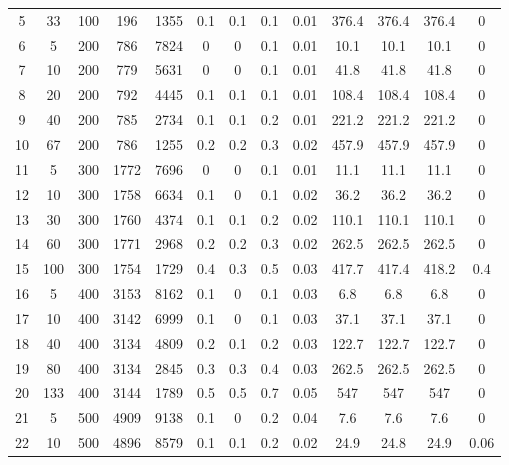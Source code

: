 \documentclass[11pt]{article}
\newcommand{\np}{\newpage}
\begin{document}
\begin{appendices}
\begin{landscape}
\begin{longtable}[c]{ccccc|cccc|cccc}
				\rowcolor[HTML]{EFEFEF} 
				5  & 33  & 100 & 196   & 1355  & 0.1 & 0.1 & 0.1 & 0.01 & 376.4 & 376.4 & 376.4 & 0    \\
				6  & 5   & 200 & 786   & 7824  & 0   & 0   & 0.1 & 0.01 & 10.1  & 10.1  & 10.1  & 0    \\
				7  & 10  & 200 & 779   & 5631  & 0   & 0   & 0.1 & 0.01 & 41.8  & 41.8  & 41.8  & 0    \\
				8  & 20  & 200 & 792   & 4445  & 0.1 & 0.1 & 0.1 & 0.01 & 108.4 & 108.4 & 108.4 & 0    \\
				9  & 40  & 200 & 785   & 2734  & 0.1 & 0.1 & 0.2 & 0.01 & 221.2 & 221.2 & 221.2 & 0    \\
				10 & 67  & 200 & 786   & 1255  & 0.2 & 0.2 & 0.3 & 0.02 & 457.9 & 457.9 & 457.9 & 0    \\
				\rowcolor[HTML]{EFEFEF} 
				11 & 5   & 300 & 1772  & 7696  & 0   & 0   & 0.1 & 0.01 & 11.1  & 11.1  & 11.1  & 0    \\
				\rowcolor[HTML]{EFEFEF} 
				12 & 10  & 300 & 1758  & 6634  & 0.1 & 0   & 0.1 & 0.02 & 36.2  & 36.2  & 36.2  & 0    \\
				\rowcolor[HTML]{EFEFEF} 
				13 & 30  & 300 & 1760  & 4374  & 0.1 & 0.1 & 0.2 & 0.02 & 110.1 & 110.1 & 110.1 & 0    \\
				\rowcolor[HTML]{EFEFEF} 
				14 & 60  & 300 & 1771  & 2968  & 0.2 & 0.2 & 0.3 & 0.02 & 262.5 & 262.5 & 262.5 & 0    \\
				\rowcolor[HTML]{EFEFEF} 
				15 & 100 & 300 & 1754  & 1729  & 0.4 & 0.3 & 0.5 & 0.03 & 417.7 & 417.4 & 418.2 & 0.4  \\
				16 & 5   & 400 & 3153  & 8162  & 0.1 & 0   & 0.1 & 0.03 & 6.8   & 6.8   & 6.8   & 0    \\
				17 & 10  & 400 & 3142  & 6999  & 0.1 & 0   & 0.1 & 0.03 & 37.1  & 37.1  & 37.1  & 0    \\
				18 & 40  & 400 & 3134  & 4809  & 0.2 & 0.1 & 0.2 & 0.03 & 122.7 & 122.7 & 122.7 & 0    \\
				19 & 80  & 400 & 3134  & 2845  & 0.3 & 0.3 & 0.4 & 0.03 & 262.5 & 262.5 & 262.5 & 0    \\
				20 & 133 & 400 & 3144  & 1789  & 0.5 & 0.5 & 0.7 & 0.05 & 547   & 547   & 547   & 0    \\ 
				\np
				\rowcolor[HTML]{EFEFEF} 
				21 & 5   & 500 & 4909  & 9138  & 0.1 & 0   & 0.2 & 0.04 & 7.6   & 7.6   & 7.6   & 0    \\
				\rowcolor[HTML]{EFEFEF} 
				22 & 10  & 500 & 4896  & 8579  & 0.1 & 0.1 & 0.2 & 0.02 & 24.9  & 24.8  & 24.9  & 0.06 \\

\end{longtable}
\end{landscape}
\end{appendices}
\end{document}
